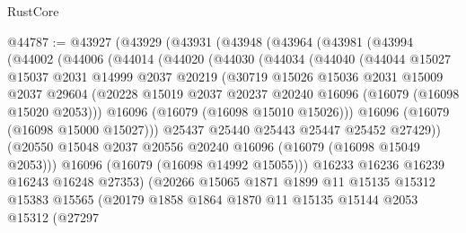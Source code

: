 \begin{lexlean}{RustCore}
\begin{coremodule}
@44787 := @43927
    (@43929
      (@43931
        (@43948
          (@43964
            (@43981
              (@43994
                (@44002
                  (@44006
                    (@44014
                      (@44020
                        (@44030
                          (@44034
                            (@44040
                              (@44044
                                @15027
                                @15037
                                @2031
                                @14999
                                @2037
                                @20219
                                (@30719
                                  @15026
                                  @15036
                                  @2031
                                  @15009
                                  @2037
                                  @29604
                                  (@20228
                                    @15019
                                    @2037
                                    @20237
                                    @20240
                                    @16096
                                    (@16079 (@16098 @15020 @2053)))
                                  @16096
                                  (@16079 (@16098 @15010 @15026)))
                                @16096
                                (@16079 (@16098 @15000 @15027)))
                              @25437
                              @25440
                              @25443
                              @25447
                              @25452
                              @27429))
                          (@20550 @15048 @2037 @20556 @20240 @16096 (@16079 (@16098 @15049 @2053)))
                          @16096
                          (@16079 (@16098 @14992 @15055)))
                        @16233
                        @16236
                        @16239
                        @16243
                        @16248
                        @27353)
                      (@20266
                        @15065
                        @1871
                        @1899
                        @11
                        @15135
                        @15312
                        @15383
                        @15565
                        (@20179
                          @1858
                          @1864
                          @1870
                          @11
                          @15135
                          @15144
                          @2053
                          @15312
                          (@27297

\end{coremodule}
\end{lexlean}
